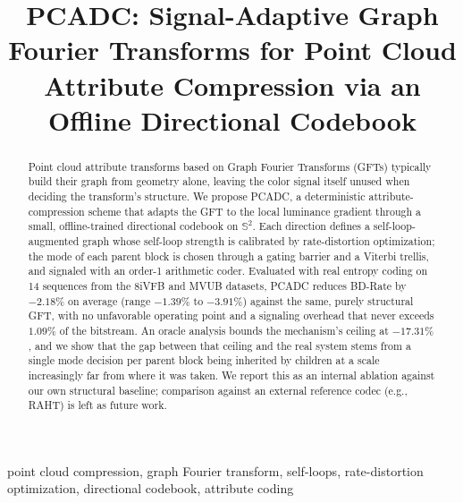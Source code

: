 \documentclass[conference]{IEEEtran}
\begin{document}
\title{PCADC: Signal-Adaptive Graph Fourier Transforms for Point Cloud\\
Attribute Compression via an Offline Directional Codebook}

\author{
}

\maketitle

\begin{abstract}
Point cloud attribute transforms based on Graph Fourier Transforms (GFTs) typically build
their graph from geometry alone, leaving the color signal itself unused when deciding the
transform's structure. We propose PCADC, a deterministic attribute-compression scheme that
adapts the GFT to the local luminance gradient through a small, offline-trained directional
codebook on $\mathbb{S}^2$. Each direction defines a self-loop-augmented graph whose self-loop
strength is calibrated by rate-distortion optimization; the mode of each parent block is chosen
through a gating barrier and a Viterbi trellis, and signaled with an order-1 arithmetic coder.
Evaluated with real entropy coding on 14 sequences from the 8iVFB and MVUB datasets, PCADC
reduces BD-Rate by $-2.18\%$ on average (range $-1.39\%$ to $-3.91\%$) against the same,
purely structural GFT, with no unfavorable operating point and a signaling overhead that never
exceeds $1.09\%$ of the bitstream. An oracle analysis bounds the mechanism's ceiling at
$-17.31\%$, and we show that the gap between that ceiling and the real system stems from a
single mode decision per parent block being inherited by children at a scale increasingly far
from where it was taken. We report this as an internal ablation against our own structural
baseline; comparison against an external reference codec (e.g., RAHT) is left as future work.
\end{abstract}

\begin{IEEEkeywords}
point cloud compression, graph Fourier transform, self-loops, rate-distortion optimization,
directional codebook, attribute coding
\end{IEEEkeywords}

\end{document}
